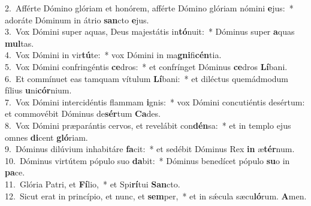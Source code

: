 {2.~}Afférte Dómino glóriam et honórem, afférte Dómino glóriam nómini \textbf{e}jus:~* adoráte Dóminum in átrio \textbf{san}cto \textbf{e}jus.\\
{3.~}Vox Dómini super aquas, Deus majestátis in\textbf{tó}nuit:~* Dóminus super \textbf{a}quas \textbf{mul}tas.\\
{4.~}Vox Dómini in vir\textbf{tú}te:~* vox Dómini in ma\textbf{gni}fi\textbf{cén}tia.\\
{5.~}Vox Dómini confringéntis \textbf{ce}dros:~* et confrínget Dóminus \textbf{ce}dros \textbf{Lí}bani.\\
{6.~}Et commínuet eas tamquam vítulum \textbf{Lí}bani:~* et diléctus quemádmodum fílius \textbf{u}ni\textbf{cór}nium.\\
{7.~}Vox Dómini intercidéntis flammam \textbf{i}gnis:~* vox Dómini concutiéntis desértum: et commovébit Dóminus de\textbf{sér}tum \textbf{Ca}des.\\
{8.~}Vox Dómini præparántis cervos, et revelábit con\textbf{dén}sa:~* et in templo ejus omnes \textbf{di}cent \textbf{gló}riam.\\
{9.~}Dóminus dilúvium inhabitáre \textbf{fa}cit:~* et sedébit Dóminus Rex \textbf{in} æ\textbf{tér}num.\\
{10.~}Dóminus virtútem pópulo suo \textbf{da}bit:~* Dóminus benedícet pópulo \textbf{su}o in \textbf{pa}ce.\\
{11.~}Glória Patri, et \textbf{Fí}lio,~* et Spi\textbf{rí}tui \textbf{San}cto.\\
{12.~}Sicut erat in princípio, et nunc, et \textbf{sem}per,~* et in sǽcula sæcu\textbf{ló}rum. \textbf{A}men.\\
